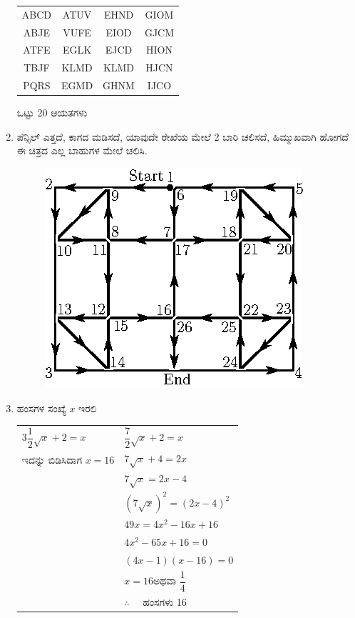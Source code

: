 \begin{enumerate}
{\fontsize{11pt}{13pt}\selectfont
\begin{tabular}[c]{cccc}
ABCD & ATUV & EHND & GIOM\\
ABJE & VUFE & EIOD & GJCM\\
ATFE & EGLK & EJCD & HION\\
TBJF & KLMD & KLMD & HJCN\\
PQRS & EGMD & GHNM & IJCO\\
\end{tabular}}\relax

\smallskip
ಒಟ್ಟು 20 ಆಯತಗಳು 

\item ಪೆನ್ಸಿಲ್ ಎತ್ತದೆ, ಕಾಗದ ಮಡಿಸದೆ, ಯಾವುದೇ ರೇಖೆಯ ಮೇಲೆ 2 ಬಾರಿ ಚಲಿಸದೆ, ಹಿಮ್ಮುಖವಾಗಿ ಹೋಗದೆ ಈ ಚಿತ್ರದ ಎಲ್ಲ ಬಾಹುಗಳ ಮೇಲೆ ಚಲಿಸಿ. 
\begin{figure}[H]
\centering
\includegraphics[scale=1.4]{images/chap6/ans16.eps}
\end{figure}

\item ಹಂಸಗಳ ಸಂಖ್ಯೆ $x$ ಇರಲಿ 

\begin{tabular}{l|l}
$3\dfrac{1}{2} \sqrt{x} + 2 = x$ & $\dfrac{7}{2} \sqrt{x} + 2 = x$\\[0.1cm]
ಇದನ್ನು ಬಿಡಿಸಿದಾಗ $x = 16$ & $7\sqrt{x} + 4 = 2x$\\[0.1cm]
& $7\sqrt{x} = 2x - 4$\\[0.1cm]
& $(7\sqrt{x})^{2} = (2x - 4)^{2}$\\[0.1cm]
& $49x = 4x^{2} - 16x + 16$\\[0.1cm]
& $4x^{2} - 65x + 16 = 0$\\[0.1cm]
& $(4x - 1) (x - 16) = 0$\\[0.1cm]
& $x= 16$\quad ಅಥವಾ \quad $\dfrac{1}{4}$\\[0.1cm]
& $\therefore\quad$ ಹಂಸಗಳು 16
\end{tabular}


\end{enumerate}
